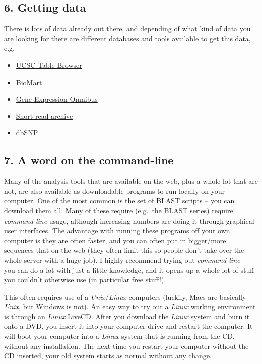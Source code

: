 \documentclass[]{article}
\begin{document}
\subsection{6. Getting data}\label{getting-data}

There is lots of data already out there, and depending of what kind of
data you are looking for there are different databases and tools
available to get this data, e.g.

\begin{itemize}
\itemsep1pt\parskip0pt
\item
  \href{http://genome.ucsc.edu/cgi-bin/hgTables?command=start}{UCSC
  Table Browser}
\item
  \href{http://www.biomart.org/biomart/martview/}{BioMart}
\item
  \href{http://www.ncbi.nlm.nih.gov/geo/}{Gene Expression Omnibus}
\item
  \href{http://www.ncbi.nlm.nih.gov/sra}{Short read archive}
\item
  \href{http://www.ncbi.nlm.nih.gov/snp/}{dbSNP}
\end{itemize}

\subsection{7. A word on the
command-line}\label{a-word-on-the-command-line}

Many of the analysis tools that are available on the web, plus a whole
lot that are not, are also available as downloadable programs to run
locally on your computer. One of the most common is the set of BLAST
scripts -- you can download them all. Many of these require (e.g.~the
BLAST series) require \emph{command-line} usage, although increasing
numbers are doing it through graphical user interfaces. The advantage
with running these programs off your own computer is they are often
faster, and you can often put in bigger/more sequences that on the web
(they often limit this so people don't take over the whole server with a
huge job). I highly recommend trying out \emph{command-line} -- you can
do a lot with just a little knowledge, and it opens up a whole lot of
stuff you couldn't otherwise use (in particular free stuff!).

This often requires use of a \emph{Unix}/\emph{Linux} computers
(luckily, Macs are basically \emph{Unix}, but Windows is not). An easy
way to try out a \emph{Linux} working environment is through an
\emph{Linux}
\href{https://help.ubuntu.com/community/LiveCD\#How-To_LiveCD_Ubuntu}{LiveCD}.
After you download the \emph{Linux} system and burn it onto a DVD, you
insert it into your computer drive and restart the computer. It will
boot your computer into a \emph{Linux} system that is running from the
CD, without any installation. The next time you restart your computer
without the CD inserted, your old system starts as normal without any
change.
\end{document}
